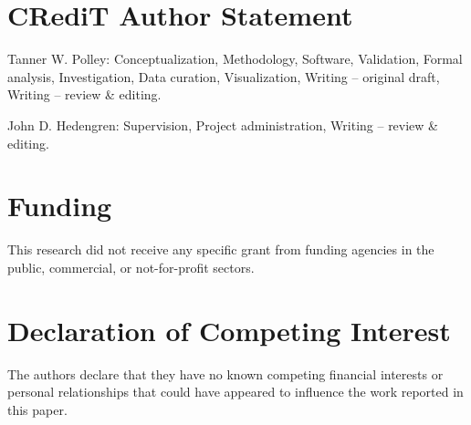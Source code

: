     \section*{CRediT Author Statement}
Tanner W. Polley: Conceptualization, Methodology, Software, Validation, Formal analysis, Investigation, Data curation, Visualization, Writing -- original draft, Writing -- review \& editing.

John D. Hedengren: Supervision, Project administration, Writing -- review \& editing.

    \section*{Funding}
This research did not receive any specific grant from funding agencies in the public, commercial, or not-for-profit sectors.

    \section*{Declaration of Competing Interest}
The authors declare that they have no known competing financial interests or personal relationships that could have appeared to influence the work reported in this paper.
